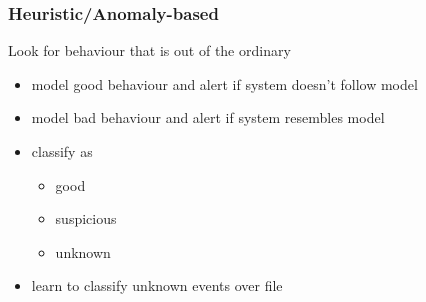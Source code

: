 \documentclass[]{article}
\theoremstyle{definition}
\begin{document}
	\subsubsection{Heuristic/Anomaly-based}
	Look for behaviour that is out of the ordinary
	\begin{itemize}
		\item model good behaviour and alert if system doesn't follow model
		\item model bad behaviour and alert if system resembles model
		\item classify as 
			\begin{itemize}
				\item good
				\item suspicious
				\item unknown
			\end{itemize}
		\item learn to classify unknown events over file
	\end{itemize}
	
\end{document}
